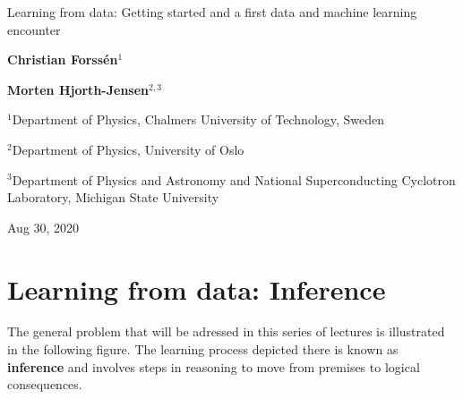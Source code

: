 \documentclass[%
oneside,                 %
final,                   %
10pt]{article}
\begin{document}

\newcommand{\exercisesection}[1]{\subsection*{#1}}







\thispagestyle{empty}

\begin{center}
{\LARGE\bf
\begin{spacing}{1.25}
Learning from data: Getting started and a first data and machine learning encounter
\end{spacing}
}
\end{center}


\begin{center}
{\bf Christian Forssén${}^{1}$} \\ [0mm]
\end{center}


\begin{center}
{\bf Morten Hjorth-Jensen${}^{2, 3}$} \\ [0mm]
\end{center}

\begin{center}
\centerline{{\small ${}^1$Department of Physics, Chalmers University of Technology, Sweden}}
\centerline{{\small ${}^2$Department of Physics, University of Oslo}}
\centerline{{\small ${}^3$Department of Physics and Astronomy and National Superconducting Cyclotron Laboratory, Michigan State University}}
\end{center}
    

\begin{center}
Aug 30, 2020
\end{center}

\vspace{1cm}


\section{Learning from data: Inference}
The general problem that will be adressed in this series of lectures is illustrated in the following figure. The learning process depicted there is known as \textbf{inference} and involves steps in reasoning to move from premises to logical consequences. 
\end{document}
